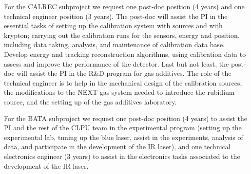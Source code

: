 For the CALREC subproject we request one post-doc position (4 years) and one technical engineer position (3 years). The post-doc will assist the PI in the essential tasks of setting up the calibration system with sources and with krypton; carrying out the calibration runs for the sensors, energy and position, including data taking, analysis, and maintenance of calibration data base. Develop energy and tracking reconstruction algorithms, using calibration data to assess and improve the performance of the detector. Last but not least, the post-doc will assist the PI in the R\&D program for gas additives. The role of the technical engineer is to help in the mechanical design of the calibration sources, the modifications to the NEXT gas system needed to introduce the rubidium source, and the setting up of the gas additives laboratory. 

For the BATA subproject we request one post-doc position (4 years) to assist the PI and the rest of the CLPU team in the experimental program (setting up the experimental lab, tuning up the blue laser, assist in the experiments, analysis of data, and participate in the development of the IR laser), and one technical electronics engineer (3 years) to assist in the electronics tasks associated to the development of the IR laser.  

